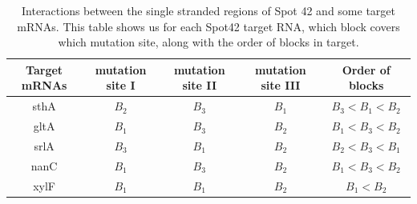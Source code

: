 \documentclass[twoside,a4paper]{report}
\numberwithin{equation}{section}
\begin{document}
\begin{table}[h!]
\centering
	\begin{tabular}{||c |c |c |c |c ||} 
		\hline
		Target mRNAs & mutation site I & mutation site II & mutation site III & Order of blocks \\ [0.2ex] 
		\hline\hline
		sthA & $B_2$ & $B_3$ & $B_1$ & $B_3 < B_1 < B_2$\\ 
		\hline
		gltA & $B_1$ & $B_3$ &  $B_2$ & $B_1 < B_3 < B_2$\\
		\hline
		srlA & $B_3$ & $B_1$ &  $B_2$ & $B_2 < B_3 < B_1 $\\
		\hline
		nanC & $B_1$ & $B_3$ &  $B_2$ & $B_1 < B_3 < B_2$\\
		\hline
		xylF & $B_1$ & $B_1$ & $B_2$ & $B_1 < B_2$ \\  
	\hline
	\end{tabular}
	\caption{Interactions between the single stranded regions of Spot 42 and some target mRNAs. This table shows us for each Spot42 target RNA, which block covers which mutation site, along with the order of blocks in target.}
	\label{table:last}
\end{table}
\end{document}
